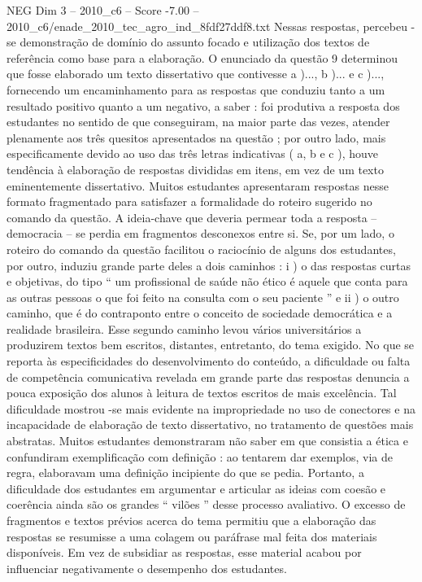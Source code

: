 \begin{textsample}{NEG Dim 3 – 2010\_c6 – Score -7.00 – 2010\_c6/enade\_2010\_tec\_agro\_ind\_8fdf27ddf8.txt}
Nessas respostas, percebeu -se demonstração de domínio do assunto focado e utilização dos textos de referência como base para a elaboração.
O enunciado da questão 9 determinou que fosse elaborado um texto dissertativo que contivesse a )..., b )... e c )..., fornecendo um encaminhamento para as respostas que conduziu tanto a um resultado positivo quanto a um negativo, a saber : foi produtiva a resposta dos estudantes no sentido de que conseguiram, na maior parte das vezes, atender plenamente aos três quesitos apresentados na questão ; por outro lado, mais especificamente devido ao uso das três letras indicativas ( a, b e c ), houve tendência à elaboração de respostas divididas em itens, em vez de um texto eminentemente dissertativo.
Muitos estudantes apresentaram respostas nesse formato fragmentado para satisfazer a formalidade do roteiro sugerido no comando da questão.
A ideia-chave que deveria permear toda a resposta – democracia – se perdia em fragmentos desconexos entre si.
Se, por um lado, o roteiro do comando da questão facilitou o raciocínio de alguns dos estudantes, por outro, induziu grande parte deles a dois caminhos : i ) o das respostas curtas e objetivas, do tipo “ um profissional de saúde não ético é aquele que conta para as outras pessoas o que foi feito na consulta com o seu paciente ” e ii ) o outro caminho, que é do contraponto entre o conceito de sociedade democrática e a realidade brasileira.
Esse segundo caminho levou vários universitários a produzirem textos bem escritos, distantes, entretanto, do tema exigido.
No que se reporta às especificidades do desenvolvimento do conteúdo, a dificuldade ou falta de competência comunicativa revelada em grande parte das respostas denuncia a pouca exposição dos alunos à leitura de textos escritos de mais excelência.
Tal dificuldade mostrou -se mais evidente na impropriedade no uso de conectores e na incapacidade de elaboração de texto dissertativo, no tratamento de questões mais abstratas.
Muitos estudantes demonstraram não saber em que consistia a ética e confundiram exemplificação com definição : ao tentarem dar exemplos, via de regra, elaboravam uma definição incipiente do que se pedia.
Portanto, a dificuldade dos estudantes em argumentar e articular as ideias com coesão e coerência ainda são os grandes “ vilões ” desse processo avaliativo.
O excesso de fragmentos e textos prévios acerca do tema permitiu que a elaboração das respostas se resumisse a uma colagem ou paráfrase mal feita dos materiais disponíveis.
Em vez de subsidiar as respostas, esse material acabou por influenciar negativamente o desempenho dos estudantes.

\end{textsample}
